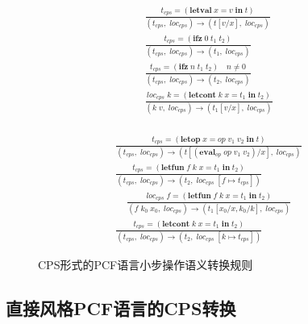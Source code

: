 \begin{figure}[htbp]
    \centering
    \begin{subfigure}[t]{0.43\textwidth}
        \setlength{\jot}{10pt}
        \begin{gather*}
            \displaystyle{\frac{t_{cps}=(\mathbf{letval}\; x=v\; \mathbf{in}\; t)} {(t_{cps},\; loc_{cps})\rightarrow (t [v/x],\; loc_{cps})}} \\
            \displaystyle{\frac{t_{cps}=(\mathbf{ifz}\; 0\; t_1\; t_2)} {(t_{cps},\; loc_{cps})\rightarrow (t_1,\; loc_{cps})}} \\
            \displaystyle{\frac{t_{cps}=(\mathbf{ifz}\; n\; t_1\; t_2)\quad n \neq 0} {(t_{cps},\; loc_{cps})\rightarrow (t_2,\; loc_{cps})}} \\
            \displaystyle{\frac{loc_{cps}\; k = (\mathbf{letcont}\; k\; x=t_1\; \mathbf{in}\; t_2)}{(k\; v,\; loc_{cps})\rightarrow (t_1 [v/x],\; loc_{cps})}} \\
        \end{gather*}
    \end{subfigure}
    \begin{subfigure}[t]{0.55\textwidth}
        \setlength{\jot}{10pt}
        \begin{gather*}
            \displaystyle{\frac{t_{cps}=(\mathbf{letop}\; x=op\; v_1\; v_2\; \mathbf{in}\; t)}
            {(t_{cps},\; loc_{cps})\rightarrow (t [(\mathbf{eval}_{op}\; op\; v_1\; v_2)/x],\; loc_{cps})}} \\
            \displaystyle{\frac{t_{cps}=(\mathbf{letfun}\; f\; k\; x=t_1\; \mathbf{in}\; t_2)} {(t_{cps},\; loc_{cps})\rightarrow (t_2,\; loc_{cps}\; [f\mapsto t_{cps}])}} \\
            \quad \displaystyle{\frac{loc_{cps}\; f = (\mathbf{letfun}\; f\; k\; x=t_1\; \mathbf{in}\; t_2)}{(f\; k_0\; x_0,\; loc_{cps})\rightarrow (t_1 [x_0/x, k_0/k],\; loc_{cps})}} \\
            \displaystyle{\frac{t_{cps}=(\mathbf{letcont}\; k\; x=t_1\; \mathbf{in}\; t_2)} {(t_{cps},\; loc_{cps})\rightarrow (t_2,\; loc_{cps}\; [k\mapsto t_{cps}])}} 
        \end{gather*}
    \end{subfigure}   
    \caption{CPS形式的PCF语言小步操作语义转换规则}\label{cpsopsem}
\end{figure}

\subsection{直接风格PCF语言的CPS转换} \label{sec:cpstrans}


